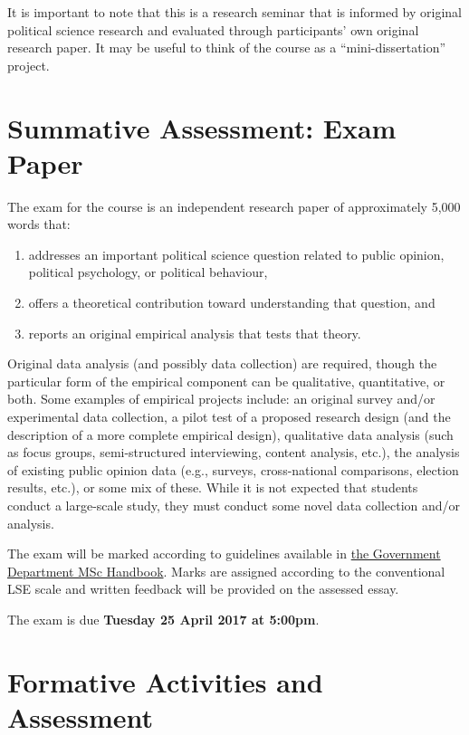 \documentclass[12pt,a4paper]{article}
\begin{document}
\noindent It is important to note that this is a research seminar that is informed by original political science research and evaluated through participants' own original research paper. It may be useful to think of the course as a ``mini-dissertation'' project.

\section{Summative Assessment: Exam Paper}

The exam for the course is an independent research paper of approximately 5,000 words that:

\begin{enumerate}
\item addresses an important political science question related to public opinion, political psychology, or political behaviour,
\item offers a theoretical contribution toward understanding that question, and 
\item reports an original empirical analysis that tests that theory.
\end{enumerate}

Original data analysis (and possibly data collection) are required, though the particular form of the empirical component can be qualitative, quantitative, or both. Some examples of empirical projects include: an original survey and/or experimental data collection, a pilot test of a proposed research design (and the description of a more complete empirical design), qualitative data analysis (such as focus groups, semi-structured interviewing, content analysis, etc.), the analysis of existing public opinion data (e.g., surveys, cross-national comparisons, election results, etc.), or some mix of these. While it is not expected that students conduct a large-scale study, they must conduct some novel data collection and/or analysis.

The exam will be marked according to guidelines available in \href{http://www.lse.ac.uk/government/degreeProgrammes/programmes/masters/MSc-Handbook-2015-6.pdf}{the Government Department MSc Handbook}. Marks are assigned according to the conventional LSE scale and written feedback will be provided on the assessed essay.

\vspace{1em}

\noindent The exam is due \textbf{Tuesday 25 April 2017 at 5:00pm}.


\section{Formative Activities and Assessment}
\end{document}
